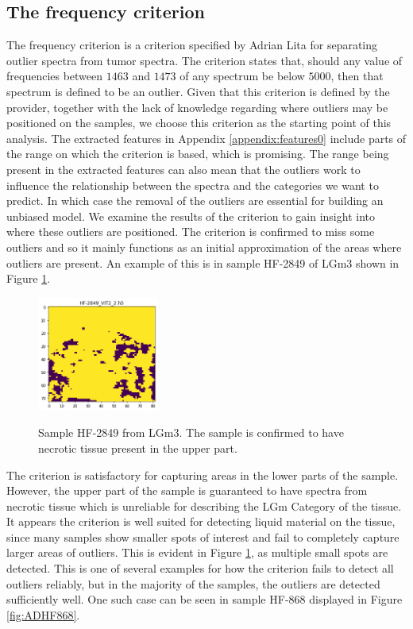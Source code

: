 \subsection{The frequency criterion}

The frequency criterion is a criterion specified by Adrian Lita for separating outlier spectra from tumor spectra. The criterion states that, should any value of frequencies between $1463$ and $1473$ of any spectrum be below $5000$, then that spectrum is defined to be an outlier. Given that this criterion is defined by the provider, together with the lack of knowledge regarding where outliers may be positioned on the samples, we choose this criterion as the starting point of this analysis. The extracted features in Appendix \ref{appendix:features0} include parts of the range on which the criterion is based, which is promising. The range being present in the extracted features can also mean that the outliers work to influence the relationship between the spectra and the categories we want to predict. In which case the removal of the outliers are essential for building an unbiased model. We examine the results of the criterion to gain insight into where these outliers are positioned. The criterion is confirmed to miss some outliers and so it mainly functions as an initial approximation of the areas where outliers are present. An example of this is in sample HF-2849 of LGm3 shown in Figure \ref{fig:HF2849_1}.

\begin{figure}[H]

    \centering
{\includegraphics[width=4cm]{images/AdriansCriterion/LGm-3/HF-2849_VIT2_2.h5_5.png} }
\caption{Sample HF-2849 from LGm3. The sample is confirmed to have necrotic tissue present in the upper part.\label{fig:HF2849_1}}%

\end{figure}

The criterion is satisfactory for capturing areas in the lower parts of the sample. However, the upper part of the sample is guaranteed to have spectra from necrotic tissue which is unreliable for describing the LGm Category of the tissue. It appears the criterion is well suited for detecting liquid material on the tissue, since many samples show smaller spots of interest and fail to completely capture larger areas of outliers. This is evident in Figure \ref{fig:HF2849_1}, as multiple small spots are detected. This is one of several examples for how the criterion fails to detect all outliers reliably, but in the majority of the samples, the outliers are detected sufficiently well. One such case can be seen in sample HF-868 displayed in Figure \ref{fig:ADHF868}.

